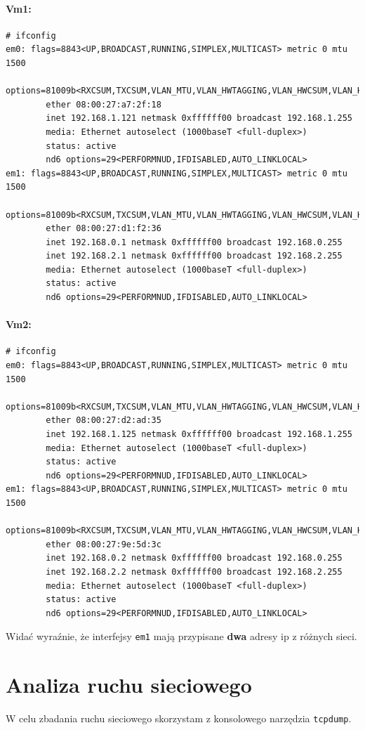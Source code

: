 \documentclass{mwart} %
\begin{document}
\paragraph{Vm1:}
\begin{verbatim}
# ifconfig
em0: flags=8843<UP,BROADCAST,RUNNING,SIMPLEX,MULTICAST> metric 0 mtu 1500
        options=81009b<RXCSUM,TXCSUM,VLAN_MTU,VLAN_HWTAGGING,VLAN_HWCSUM,VLAN_HWFILTER>
        ether 08:00:27:a7:2f:18
        inet 192.168.1.121 netmask 0xffffff00 broadcast 192.168.1.255
        media: Ethernet autoselect (1000baseT <full-duplex>)
        status: active
        nd6 options=29<PERFORMNUD,IFDISABLED,AUTO_LINKLOCAL>
em1: flags=8843<UP,BROADCAST,RUNNING,SIMPLEX,MULTICAST> metric 0 mtu 1500
        options=81009b<RXCSUM,TXCSUM,VLAN_MTU,VLAN_HWTAGGING,VLAN_HWCSUM,VLAN_HWFILTER>
        ether 08:00:27:d1:f2:36
        inet 192.168.0.1 netmask 0xffffff00 broadcast 192.168.0.255
        inet 192.168.2.1 netmask 0xffffff00 broadcast 192.168.2.255
        media: Ethernet autoselect (1000baseT <full-duplex>)
        status: active
        nd6 options=29<PERFORMNUD,IFDISABLED,AUTO_LINKLOCAL>
\end{verbatim}

\paragraph{Vm2:}
\begin{verbatim}
# ifconfig
em0: flags=8843<UP,BROADCAST,RUNNING,SIMPLEX,MULTICAST> metric 0 mtu 1500
        options=81009b<RXCSUM,TXCSUM,VLAN_MTU,VLAN_HWTAGGING,VLAN_HWCSUM,VLAN_HWFILTER>
        ether 08:00:27:d2:ad:35
        inet 192.168.1.125 netmask 0xffffff00 broadcast 192.168.1.255
        media: Ethernet autoselect (1000baseT <full-duplex>)
        status: active
        nd6 options=29<PERFORMNUD,IFDISABLED,AUTO_LINKLOCAL>
em1: flags=8843<UP,BROADCAST,RUNNING,SIMPLEX,MULTICAST> metric 0 mtu 1500
        options=81009b<RXCSUM,TXCSUM,VLAN_MTU,VLAN_HWTAGGING,VLAN_HWCSUM,VLAN_HWFILTER>
        ether 08:00:27:9e:5d:3c
        inet 192.168.0.2 netmask 0xffffff00 broadcast 192.168.0.255
        inet 192.168.2.2 netmask 0xffffff00 broadcast 192.168.2.255
        media: Ethernet autoselect (1000baseT <full-duplex>)
        status: active
        nd6 options=29<PERFORMNUD,IFDISABLED,AUTO_LINKLOCAL>
\end{verbatim}

Widać wyraźnie, że interfejsy \texttt{em1} mają przypisane \textbf{dwa} adresy ip z różnych sieci.

\section{Analiza ruchu sieciowego}
W celu zbadania ruchu sieciowego skorzystam z konsolowego narzędzia \texttt{tcpdump}.
\end{document}
